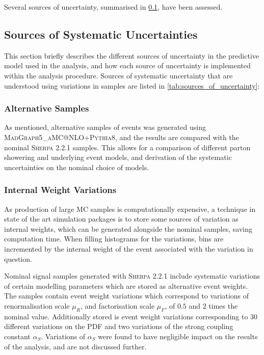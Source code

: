 Several sources of uncertainty, summarised in \cref{sec:sources_of_uncertainties}, have been assessed.

\subsection{Sources of Systematic Uncertainties}\label{sec:sources_of_uncertainties}

This section briefly describes the different sources of uncertainty in the predictive model used in the analysis, and how each source of uncertainty is implemented within the analysis procedure.
Sources of systematic uncertainty that are understood using variations in samples are listed in \cref{tab:sources_of_uncertainty}:
%

%

\subsubsection{Alternative Samples}
As mentioned, alternative samples of \Vjets events was generated using \textsc{MadGraph5\_aMC@NLO+Pythia8}, and the results are compared with the nominal \textsc{Sherpa 2.2.1} samples. This allows for a comparison of different parton showering and underlying event models, and derivation of the systematic uncertainties on the nominal choice of models.

\subsubsection{Internal Weight Variations}
As production of large MC samples is computationally expensive, a technique in state of the art simulation packages is to store some sources of variation as internal weights, which can be generated alongside the nominal samples, saving computation time. When filling histograms for the variations, bins are incremented by the internal weight of the event associated with the variation in question.

Nominal signal samples generated with \textsc{Sherpa 2.2.1} include systematic variations of certain modelling parameters which are stored as alternative event weights. The samples contain event weight variations which correspond to variations of renormalisation scale $\mu_R$, and factorisation scale $\mu_F$, of $0.5$ and $2$ times the nominal value. Additionally stored is event weight variations corresponding to $30$ different variations on the PDF and two variations of the strong coupling constant $\alpha_S$. Variations of $\alpha_S$ were found to have negligible impact on the results of the analysis, and are not discussed further. 

